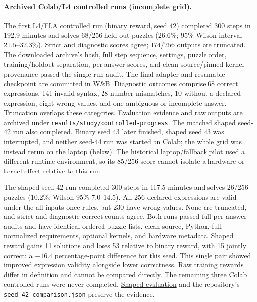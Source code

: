 \documentclass[11pt]{article}
\begin{document}
\paragraph{Archived Colab/L4 controlled runs (incomplete grid).}
The first L4/FLA controlled run (binary reward, seed 42) completed 300 steps in
192.9 minutes and solves 68/256 held-out puzzles (26.6\%; 95\% Wilson interval
21.5--32.3\%). Strict and diagnostic scores agree; 174/256 outputs are truncated.
The downloaded archive's hash, full step sequence, settings, puzzle order,
training/holdout separation, per-answer scores, and clean source/pinned-kernel
provenance passed the single-run audit. The final adapter and resumable checkpoint
are committed in W\&B. Diagnostic outcomes comprise 68 correct expressions,
141 invalid syntax, 28 number mismatches, 10 without a declared expression,
eight wrong values, and one ambiguous or incomplete answer. Truncation overlaps
these categories. \href{https://wandb.ai/mohamedsobhi777/countdown-grpo/runs/9xwjji2l}{Evaluation evidence}
and raw outputs are archived under \texttt{results/study/controlled-progress}.
The matched shaped seed-42 run also completed. Binary seed 43 later finished,
shaped seed 43 was interrupted, and neither seed-44 run was started on Colab;
the whole grid was instead rerun on the laptop (below).
The historical laptop/fallback pilot used a different runtime environment, so
its 85/256 score cannot isolate a hardware or kernel effect relative to this run.

The shaped seed-42 run completed 300 steps in 117.5 minutes and solves
26/256 puzzles (10.2\%; Wilson 95\% 7.0--14.5). All 256 declared expressions
are valid under the all-inputs-once rules, but 230 have wrong values. None are
truncated, and strict and diagnostic correct counts agree. Both runs passed
full per-answer audits and have identical ordered puzzle lists, clean source,
Python, full normalized requirements, optional kernels, and hardware metadata.
Shaped reward gains 11 solutions and loses 53 relative to binary reward, with
15 jointly correct: a $-16.4$ percentage-point difference for this seed.
This single pair showed improved expression validity alongside lower correctness.
Raw training rewards differ in definition and cannot be compared directly.
The remaining three Colab controlled runs were never completed.
\href{https://wandb.ai/mohamedsobhi777/countdown-grpo/runs/83tmr7i5}{Shaped evaluation}
and the repository's \texttt{seed-42-comparison.json} preserve the evidence.
\end{document}
